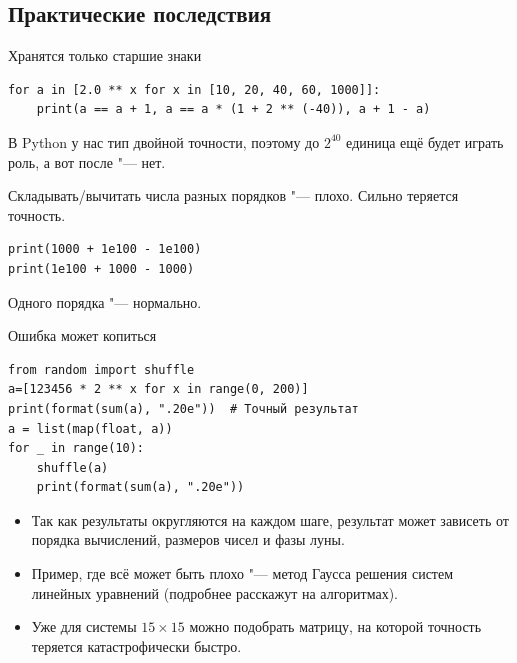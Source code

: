 \subsection{Практические последствия}

\begin{frame}
\end{frame}

\begin{frame}[fragile]{Хранятся только старшие знаки}
\begin{verbatim}
for a in [2.0 ** x for x in [10, 20, 40, 60, 1000]]:
    print(a == a + 1, a == a * (1 + 2 ** (-40)), a + 1 - a)
\end{verbatim}
	В Python у нас тип двойной точности, поэтому до $2^{40}$ единица ещё будет играть роль, а вот после "--- нет.

	Складывать/вычитать числа разных порядков "--- плохо.
	Сильно теряется точность.
\begin{verbatim}
print(1000 + 1e100 - 1e100)
print(1e100 + 1000 - 1000)
\end{verbatim}
	Одного порядка "--- нормально.
\end{frame}

\begin{frame}[fragile]{Ошибка может копиться}
\begin{verbatim}
from random import shuffle
a=[123456 * 2 ** x for x in range(0, 200)]
print(format(sum(a), ".20e"))  # Точный результат
a = list(map(float, a))
for _ in range(10):
    shuffle(a)
    print(format(sum(a), ".20e"))
\end{verbatim}
	\begin{itemize}
		\item
			Так как результаты округляются на каждом шаге, результат может зависеть от порядка вычислений, размеров чисел и фазы луны.
		\item
			Пример, где всё может быть плохо "--- метод Гаусса решения систем линейных уравнений (подробнее расскажут на алгоритмах).
		\item
			Уже для системы $15 \times 15$ можно подобрать матрицу, на которой точность теряется катастрофически быстро.
	\end{itemize}
\end{frame}


